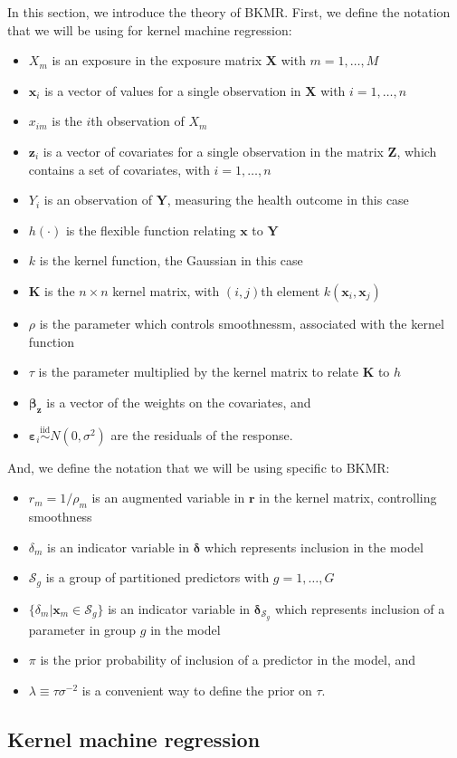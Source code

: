 \documentclass[12pt, twoside]{amherstthesis}
\providecommand{\tightlist}{%
  \setlength{\itemsep}{0pt}\setlength{\parskip}{0pt}}
\begin{document}
In this section, we introduce the theory of BKMR. First, we define the notation that we will be using for kernel machine regression:
\begin{itemize}
\tightlist
\item
  \(X_m\) is an exposure in the exposure matrix \(\textbf{X}\) with \(m = 1, \dots, M\)
\item
  \(\textbf{x}_i\) is a vector of values for a single observation in \(\textbf{X}\) with \(i = 1, \dots, n\)
\item
  \(x_{im}\) is the \(i\)th observation of \(X_m\)
\item
  \(\textbf{z}_i\) is a vector of covariates for a single observation in the matrix \(\textbf{Z}\), which contains a set of covariates, with \(i = 1, \dots, n\)
\item
  \(Y_i\) is an observation of \(\textbf{Y}\), measuring the health outcome in this case
\item
  \(h(\cdot)\) is the flexible function relating \(\textbf{x}\) to \(\textbf{Y}\)
\item
  \(k\) is the kernel function, the Gaussian in this case
\item
  \(\textbf{K}\) is the \(n \times n\) kernel matrix, with \((i, j)\)th element \(k(\textbf{x}_i, \textbf{x}_j)\)
\item
  \(\rho\) is the parameter which controls smoothnessm, associated with the kernel function
\item
  \(\tau\) is the parameter multiplied by the kernel matrix to relate \(\textbf{K}\) to \(h\)
\item
  \(\boldsymbol{\beta}_{\textbf{z}}\) is a vector of the weights on the covariates, and
\item
  \(\boldsymbol\varepsilon_i \overset{\mathrm{iid}}{\sim} N(0, \sigma^2)\) are the residuals of the response.
\end{itemize}
And, we define the notation that we will be using specific to BKMR:
\begin{itemize}
\tightlist
\item
  \(r_m=1/\rho_m\) is an augmented variable in \(\textbf{r}\) in the kernel matrix, controlling smoothness
\item
  \(\delta_m\) is an indicator variable in \(\boldsymbol\delta\) which represents inclusion in the model
\item
  \(\mathcal{S}_g\) is a group of partitioned predictors with \({g=1,\dots,G}\)
\item
  \(\{\delta_m|\textbf{x}_m \in{\mathcal{S}_g}\}\) is an indicator variable in \(\boldsymbol\delta_{\mathcal{S}_g}\) which represents inclusion of a parameter in group \(g\) in the model
\item
  \(\pi\) is the prior probability of inclusion of a predictor in the model, and
\item
  \(\lambda \equiv \tau\sigma^{-2}\) is a convenient way to define the prior on \(\tau\).
\end{itemize}
\hypertarget{kernel-machine-regression}{%
\subsection{Kernel machine regression}\label{kernel-machine-regression}}
\end{document}
